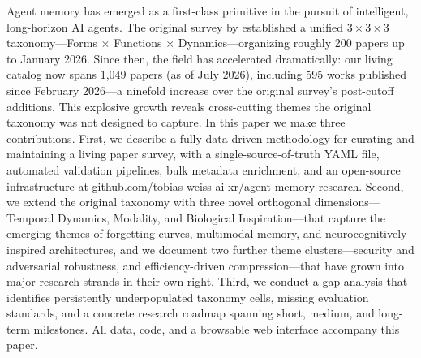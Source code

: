 Agent memory has emerged as a first-class primitive in the pursuit of intelligent, long-horizon AI agents. The original survey by \citet{DBLP:journals/corr/abs-2512-13564} established a unified $3\times 3 \times 3$ taxonomy---Forms $\times$ Functions $\times$ Dynamics---organizing roughly 200 papers up to January 2026. Since then, the field has accelerated dramatically: our living catalog now spans 1,049 papers (as of July 2026), including 595 works published since February 2026---a ninefold increase over the original survey's post-cutoff additions. This explosive growth reveals cross-cutting themes the original taxonomy was not designed to capture. In this paper we make three contributions. First, we describe a fully data-driven methodology for curating and maintaining a living paper survey, with a single-source-of-truth YAML file, automated validation pipelines, bulk metadata enrichment, and an open-source infrastructure at \url{github.com/tobias-weiss-ai-xr/agent-memory-research}. Second, we extend the original taxonomy with three novel orthogonal dimensions---Temporal Dynamics, Modality, and Biological Inspiration---that capture the emerging themes of forgetting curves, multimodal memory, and neurocognitively inspired architectures, and we document two further theme clusters---security and adversarial robustness, and efficiency-driven compression---that have grown into major research strands in their own right. Third, we conduct a gap analysis that identifies persistently underpopulated taxonomy cells, missing evaluation standards, and a concrete research roadmap spanning short, medium, and long-term milestones. All data, code, and a browsable web interface accompany this paper.
